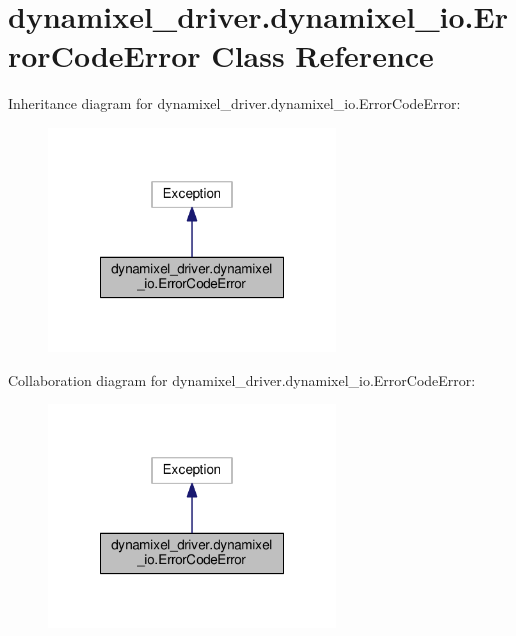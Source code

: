 \hypertarget{classdynamixel__driver_1_1dynamixel__io_1_1_error_code_error}{}\section{dynamixel\+\_\+driver.\+dynamixel\+\_\+io.\+Error\+Code\+Error Class Reference}
\label{classdynamixel__driver_1_1dynamixel__io_1_1_error_code_error}


Inheritance diagram for dynamixel\+\_\+driver.\+dynamixel\+\_\+io.\+Error\+Code\+Error\+:
\nopagebreak
\begin{figure}[H]
\begin{center}
\leavevmode
\includegraphics[width=216pt]{d0/d18/classdynamixel__driver_1_1dynamixel__io_1_1_error_code_error__inherit__graph}
\end{center}
\end{figure}


Collaboration diagram for dynamixel\+\_\+driver.\+dynamixel\+\_\+io.\+Error\+Code\+Error\+:
\nopagebreak
\begin{figure}[H]
\begin{center}
\leavevmode
\includegraphics[width=216pt]{d7/dea/classdynamixel__driver_1_1dynamixel__io_1_1_error_code_error__coll__graph}
\end{center}
\end{figure}
